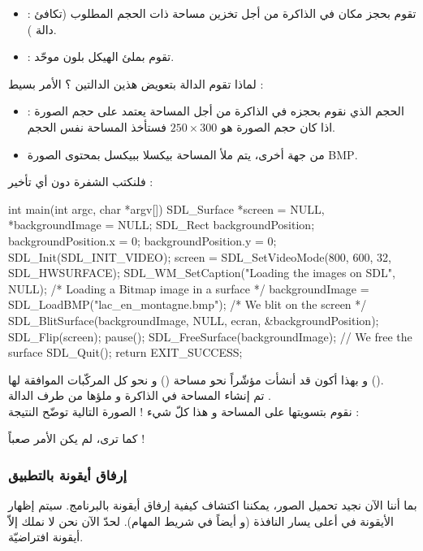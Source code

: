 \begin{itemize}
	\item {} :
	تقوم بحجز مكان في الذاكرة من أجل تخزين مساحة ذات الحجم المطلوب (تكافئ دالة 
	).
	\item {} :
	تقوم بملئ الهيكل بلون موحّد.
\end{itemize}
لماذا تقوم الدالة بتعويض هذين الدالتين ؟ الأمر بسيط :
\begin{itemize}
	\item الحجم الذي نقوم بحجزه في الذاكرة  من أجل المساحة يعتمد على حجم الصورة : اذا كان حجم الصورة هو 
	$250 \times 300$
	فستأخذ المساحة نفس الحجم.
	\item من جهة أخرى، يتم ملأ المساحة بيكسلا ببيكسل بمحتوى الصورة 
	\textenglish{BMP}.
\end{itemize}

فلنكتب الشفرة دون أي تأخير :

\begin{Csource}
int main(int argc, char *argv[])
{
	SDL_Surface *screen = NULL, *backgroundImage = NULL;
	SDL_Rect backgroundPosition;
	backgroundPosition.x = 0;
	backgroundPosition.y = 0;
	SDL_Init(SDL_INIT_VIDEO);
	screen = SDL_SetVideoMode(800, 600, 32, SDL_HWSURFACE);
	SDL_WM_SetCaption("Loading the images on SDL", NULL);
	/* Loading a Bitmap image in a surface */	
	backgroundImage = SDL_LoadBMP("lac_en_montagne.bmp");
	/* We blit on the screen */
	SDL_BlitSurface(backgroundImage, NULL, ecran, &backgroundPosition);
	SDL_Flip(screen);
	pause();
	SDL_FreeSurface(backgroundImage); // We free the surface
	SDL_Quit();
	return EXIT_SUCCESS;
}
\end{Csource}

و بهذا أكون قد أنشأت مؤشّراً نحو مساحة
()
و نحو كل المركّبات الموافقة لها
().\\
تم إنشاء المساحة في الذاكرة و ملؤها من طرف الدالة 
.\\
نقوم بتسويتها على المساحة 
و هذا كلّ شيء ! الصورة التالية توضّح النتيجة :


كما ترى، لم يكن الأمر صعباً !

\subsubsection{إرفاق أيقونة بالتطبيق}

بما أننا الآن نجيد تحميل الصور، يمكننا اكتشاف كيفية إرفاق أيقونة بالبرنامج. سيتم إظهار الأيقونة في أعلى يسار النافذة (و أيضاً في شريط المهام). لحدّ الآن نحن لا نملك إلاّ أيقونة افتراضيّة.

